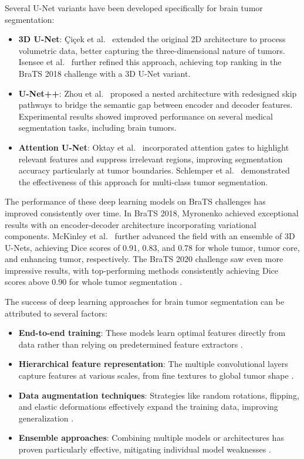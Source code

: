 Several U-Net variants have been developed specifically for brain tumor segmentation:

\begin{itemize}
  \item \textbf{3D U-Net}: Çiçek et al.\ \cite{Cicek2016} extended the original 2D architecture to process volumetric data, better capturing the three-dimensional nature of tumors. Isensee et al.\ \cite{Isensee2018} further refined this approach, achieving top ranking in the BraTS 2018 challenge with a 3D U-Net variant.

  \item \textbf{U-Net++}: Zhou et al.\ \cite{Zhou2019} proposed a nested architecture with redesigned skip pathways to bridge the semantic gap between encoder and decoder features. Experimental results showed improved performance on several medical segmentation tasks, including brain tumors.

  \item \textbf{Attention U-Net}: Oktay et al.\ \cite{Oktay2018} incorporated attention gates to highlight relevant features and suppress irrelevant regions, improving segmentation accuracy particularly at tumor boundaries. Schlemper et al.\ \cite{Schlemper2019} demonstrated the effectiveness of this approach for multi-class tumor segmentation.
\end{itemize}

The performance of these deep learning models on BraTS challenges has improved consistently over time. In BraTS 2018, Myronenko \cite{Myronenko2018} achieved exceptional results with an encoder-decoder architecture incorporating variational components. McKinley et al.\ \cite{McKinley2019} further advanced the field with an ensemble of 3D U-Nets, achieving Dice scores of 0.91, 0.83, and 0.78 for whole tumor, tumor core, and enhancing tumor, respectively. The BraTS 2020 challenge saw even more impressive results, with top-performing methods consistently achieving Dice scores above 0.90 for whole tumor segmentation \cite{Isensee2021}.

The success of deep learning approaches for brain tumor segmentation can be attributed to several factors:

\begin{itemize}
  \item \textbf{End-to-end training}: These models learn optimal features directly from data rather than relying on predetermined feature extractors \cite{Havaei2017}.
  \item \textbf{Hierarchical feature representation}: The multiple convolutional layers capture features at various scales, from fine textures to global tumor shape \cite{Kamnitsas2017}.
  \item \textbf{Data augmentation techniques}: Strategies like random rotations, flipping, and elastic deformations effectively expand the training data, improving generalization \cite{Pereira2016}.
  \item \textbf{Ensemble approaches}: Combining multiple models or architectures has proven particularly effective, mitigating individual model weaknesses \cite{Wang2019}.
\end{itemize}

